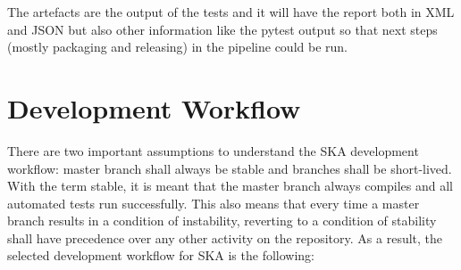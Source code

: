 \documentclass[a4paper]{spie}  %
\begin{document}
The artefacts are the output of the tests and it will have the report both in XML and JSON but also other information like the pytest output so that next steps (mostly packaging and releasing) in the pipeline could be run.

\section{Development Workflow}
There are two important assumptions to understand the SKA development workflow: master branch shall always be stable and branches shall be short-lived. With the term stable, it is meant that the master branch always compiles and all automated tests run successfully. This also means that every time a master branch results in a condition of instability, reverting to a condition of stability shall have precedence over any other activity on the repository.
As a result, the selected development workflow for SKA is the following:
\end{document}

